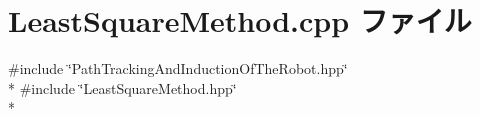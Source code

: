 \section{Least\-Square\-Method.\-cpp ファイル}
\label{_least_square_method_8cpp}
{\ttfamily \#include \char`\"{}Path\-Tracking\-And\-Induction\-Of\-The\-Robot.\-hpp\char`\"{}}\\*
{\ttfamily \#include \char`\"{}Least\-Square\-Method.\-hpp\char`\"{}}\\*

